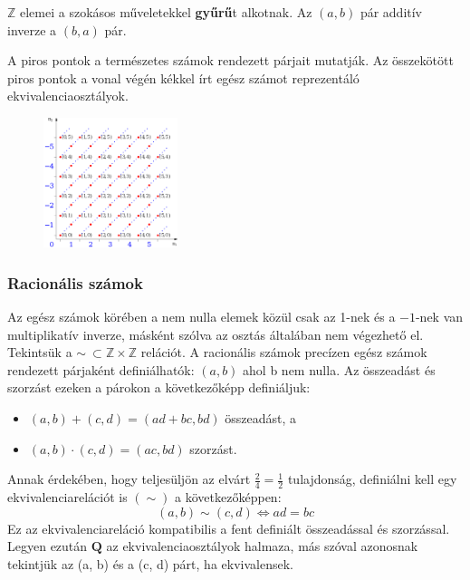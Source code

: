 \documentclass[12pt,margin=0px]{article}
\newcommand\ddfrac[2]{\frac{\displaystyle #1}{\displaystyle #2}}
\newcommand{\Z}{\mathbb{Z}}
\begin{document}
        \noindent $\mathbb{Z}$ elemei a szokásos műveletekkel \textbf{gyűrű}t alkotnak. Az $(a,b)$ pár additív inverze a $(b,a)$ pár.

        \noindent A piros pontok a természetes számok rendezett párjait mutatják. Az összekötött piros pontok a vonal végén kékkel írt egész számot reprezentáló ekvivalenciaosztályok.
        \begin{figure}[H]
            \centering
            \includegraphics[width=0.35\textwidth]{img/660px-Relative_numbers_representation.svg.png}
            \label{fig:z}
        \end{figure}

    \subsubsection*{Racionális számok}
    Az egész számok körében a nem nulla elemek közül csak az 1-nek és a $-1$-nek van multiplikatív inverze, másként szólva az osztás általában nem végezhető el.
    Tekintsük a $\sim\ \subset\Z\times\Z$ relációt. A racionális számok precízen egész számok rendezett párjaként definiálhatók: $(a, b )$ ahol b nem nulla. Az összeadást és szorzást ezeken a párokon a következőképp definiáljuk:

    \begin{itemize}[leftmargin=5.5mm]
            \renewcommand{\labelitemi}{$\vcenter{\hbox{\tiny$\bullet$}}$}
                \item $(a,b)+(c,d) = (ad+bc, bd)$ összeadást, a
                \item $(a,b)\cdot(c,d)=(ac, bd)$ szorzást.
    \end{itemize}

    \noindent Annak érdekében, hogy teljesüljön az elvárt ${{\ddfrac {2}{4}}={\ddfrac {1}{2}}}$ tulajdonság, definiálni kell egy ekvivalenciarelációt is $( \sim )$ a következőképpen:
    \[{\displaystyle \left(a,b\right)\sim \left(c,d\right)\Leftrightarrow ad=bc}\]
    \noindent Ez az ekvivalenciareláció kompatibilis a fent definiált összeadással és szorzással. Legyen ezután $\textbf{Q}$ az ekvivalenciaosztályok halmaza, más szóval azonosnak tekintjük az (a, b) és a (c, d) párt, ha ekvivalensek.\\
\end{document}
